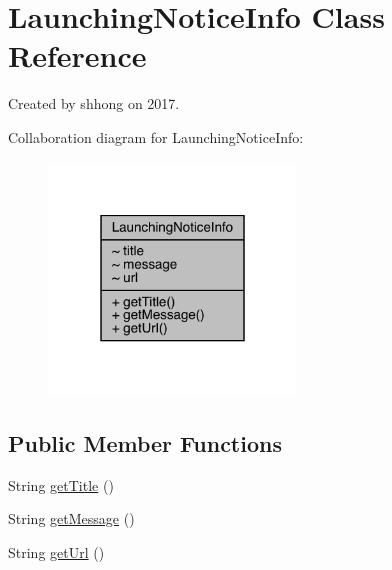 \hypertarget{classcom_1_1toast_1_1android_1_1gamebase_1_1launching_1_1data_1_1_launching_notice_info}{}\section{Launching\+Notice\+Info Class Reference}
\label{classcom_1_1toast_1_1android_1_1gamebase_1_1launching_1_1data_1_1_launching_notice_info}


Created by shhong on 2017.  




Collaboration diagram for Launching\+Notice\+Info\+:\nopagebreak
\begin{figure}[H]
\begin{center}
\leavevmode
\includegraphics[width=187pt]{classcom_1_1toast_1_1android_1_1gamebase_1_1launching_1_1data_1_1_launching_notice_info__coll__graph}
\end{center}
\end{figure}
\subsection*{Public Member Functions}
\begin{DoxyCompactItemize}
\item 
String \hyperlink{classcom_1_1toast_1_1android_1_1gamebase_1_1launching_1_1data_1_1_launching_notice_info_a888f94790c968e3f0b5de17e509098aa}{get\+Title} ()
\item 
String \hyperlink{classcom_1_1toast_1_1android_1_1gamebase_1_1launching_1_1data_1_1_launching_notice_info_afafd068b736520af1e24269a284980a9}{get\+Message} ()
\item 
String \hyperlink{classcom_1_1toast_1_1android_1_1gamebase_1_1launching_1_1data_1_1_launching_notice_info_ad2ea28664c7db5089385e62816477d28}{get\+Url} ()
\end{DoxyCompactItemize}


